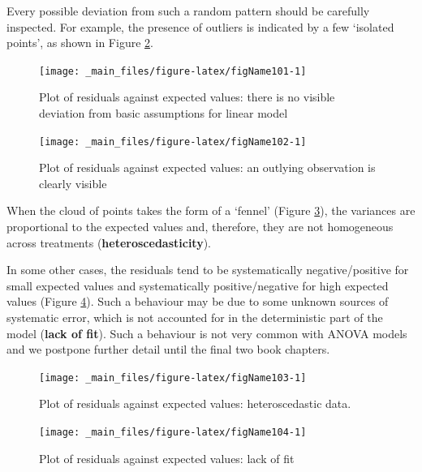 \documentclass[a4paper,12pt,oneside]{book}
\begin{document}
Every possible deviation from such a random pattern should be carefully inspected. For example, the presence of outliers is indicated by a few `isolated points', as shown in Figure \ref{fig:figName102}.

\begin{figure}

{\centering \texttt{[image: \_main\_files/figure-latex/figName101-1]} 

}

\caption{Plot of residuals against expected values: there is no visible deviation from basic assumptions for linear model}\label{fig:figName101}
\end{figure}

\begin{figure}

{\centering \texttt{[image: \_main\_files/figure-latex/figName102-1]} 

}

\caption{Plot of residuals against expected values: an outlying observation is clearly visible}\label{fig:figName102}
\end{figure}

When the cloud of points takes the form of a `fennel' (Figure \ref{fig:figName103}), the variances are proportional to the expected values and, therefore, they are not homogeneous across treatments (\textbf{heteroscedasticity}).

In some other cases, the residuals tend to be systematically negative/positive for small expected values and systematically positive/negative for high expected values (Figure \ref{fig:figName104}). Such a behaviour may be due to some unknown sources of systematic error, which is not accounted for in the deterministic part of the model (\textbf{lack of fit}). Such a behaviour is not very common with ANOVA models and we postpone further detail until the final two book chapters.

\begin{figure}

{\centering \texttt{[image: \_main\_files/figure-latex/figName103-1]} 

}

\caption{Plot of residuals against expected values: heteroscedastic data.}\label{fig:figName103}
\end{figure}

\begin{figure}

{\centering \texttt{[image: \_main\_files/figure-latex/figName104-1]} 

}

\caption{Plot of residuals against expected values: lack of fit}\label{fig:figName104}
\end{figure}
\end{document}
